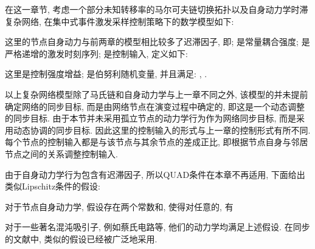         在这一章节, 考虑一个部分未知转移率的马尔可夫链切换拓扑以及自身动力学时滞复杂网络, 在集中式事件激发采样控制策略下的数学模型如下:
        \begin{comment}\label{sys:cen}
           \nonumber \dot{x}_{i}(t)&=f(t,x_{i}(t),x_i(t-\tau))-c\sum^N_{j=1}l_{ij}(r_{t})\Gamma[x_{j}(t_k)-x_{i}(t_{k})]+u_i(t),\\
            &\quad\quad t_{k}\leq t< t_{k+1}, \quad i = 1,\cdots,N,
        \end{comment}
        这里的节点自身动力与前两章的模型相比较多了迟滞因子, 即; 是常量耦合强度;
        是严格递增的激发时刻序列;
        是控制输入, 定义如下:
        \begin{comment}\label{control}
            u_i(t)=-\rho c\beta_{i}(t)\frac{1}{N}\sum_{j=1}^N\Gamma[x_{i}(t_{k})-x_j(t_{k})],
        \end{comment}
        这里是控制强度增益; 是伯努利随机变量, 并且满足: , .
        \begin{rem}
            以上复杂网络模型除了马氏链和自身动力学与上一章不同之外, 该模型的并未提前确定网络的同步目标, 而是由网络节点在演变过程中确定的, 即这是一个动态调整的同步目标. 由于本节并未采用孤立节点的动力学行为作为网络同步目标, 而是采用动态协调的同步目标. 因此这里的控制输入的形式与上一章的控制形式有所不同. 每个节点的控制输入都是与该节点与其余节点的差成正比, 即根据节点自身与邻居节点之间的关系调整控制输入.
        \end{rem}

        由于自身动力学行为包含有迟滞因子, 所以QUAD条件在本章不再适用, 下面给出类似Lipschitz条件的假设:
        \begin{hyp}{\rm{}}\label{ass1}
            对于节点自身动力学, 假设存在两个常数和, 使得对任意的, 有
         \begin{comment}
        \|f(t,x(t),x(t-\tau))-f(t,y(t),y(t-\tau))\|
        \leq\alpha_1\|x(t)-y(t)\|+\alpha_2\|x(t-\tau)-y(t-\tau)\|.
        \end{comment}
        \end{hyp}
    对于一些著名混沌吸引子, 例如蔡氏电路等, 他们的动力学均满足上述假设. 在同步的文献中, 类似的假设已经被广泛地采用.

